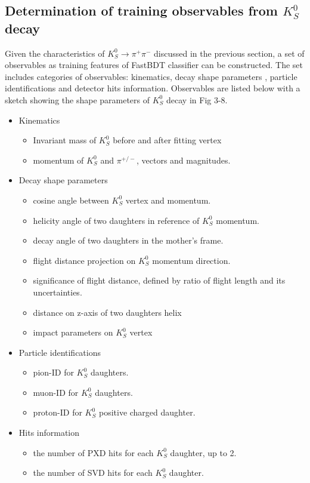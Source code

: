 \subsection{Determination of training observables from $K_S^0$ decay }
Given the characteristics of  $K_S^0 \to \pi^+ \pi^-$ discussed in the previous section, a set of observables as training features of FastBDT classifier can be constructed. The set includes categories of observables: kinematics, decay shape parameters , particle identifications and detector hits information. Observables are listed below with a sketch showing the shape parameters of $K_S^0$ decay in Fig 3-8. 

\begin{itemize}
	\item Kinematics
	\begin{itemize}
		\item Invariant mass of $K_S^0$ before and after fitting vertex
		\item momentum of $K_S^0$ and $\pi^{+/-}$, vectors and magnitudes. 
	\end{itemize}
	
	\item Decay shape parameters
	\begin{itemize}
		\item cosine angle between $K_S^0$ vertex and momentum.
		\item helicity angle of two daughters in reference of $K_S^0$ momentum.
		\item decay angle of two daughters in the mother's frame. 
		\item flight distance projection on $K_S^0$ momentum direction.
		\item significance of flight distance, defined by ratio of flight length and its uncertainties.
		\item distance on z-axis of two daughters helix 
		\item impact parameters on $K_S^0$ vertex
	\end{itemize}
	
	\item Particle identifications
	\begin{itemize}
		\item pion-ID for $K_S^0$ daughters.
		\item muon-ID for $K_S^0$ daughters.
		\item proton-ID for $K_S^0$ positive charged daughter. 
	\end{itemize}

	\item Hits information
	\begin{itemize}
		\item the number of PXD hits for each $K_S^0$ daughter, up to 2.
		\item the number of SVD hits for each $K_S^0$ daughter.
	\end{itemize}
	
\end{itemize}

